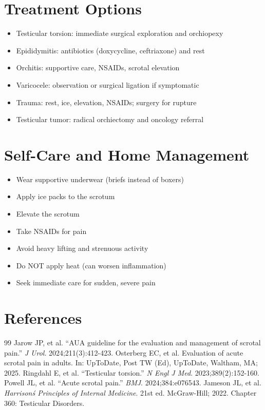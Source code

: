 \section*{Treatment Options}
\begin{itemize}
\item Testicular torsion: immediate surgical exploration and orchiopexy
\item Epididymitis: antibiotics (doxycycline, ceftriaxone) and rest
\item Orchitis: supportive care, NSAIDs, scrotal elevation
\item Varicocele: observation or surgical ligation if symptomatic
\item Trauma: rest, ice, elevation, NSAIDs; surgery for rupture
\item Testicular tumor: radical orchiectomy and oncology referral
\end{itemize}

\section*{Self-Care and Home Management}
\begin{itemize}
\item Wear supportive underwear (briefs instead of boxers)
\item Apply ice packs to the scrotum
\item Elevate the scrotum
\item Take NSAIDs for pain
\item Avoid heavy lifting and strenuous activity
\item Do NOT apply heat (can worsen inflammation)
\item Seek immediate care for sudden, severe pain
\end{itemize}

\section*{References}
\begin{thebibliography}{99}
 Jarow JP, et al. ``AUA guideline for the evaluation and management of scrotal pain.'' \emph{J Urol}. 2024;211(3):412-423.
 Osterberg EC, et al. Evaluation of acute scrotal pain in adults. In: UpToDate, Post TW (Ed), UpToDate, Waltham, MA; 2025.
 Ringdahl E, et al. ``Testicular torsion.'' \emph{N Engl J Med}. 2023;389(2):152-160.
 Powell JL, et al. ``Acute scrotal pain.'' \emph{BMJ}. 2024;384:e076543.
 Jameson JL, et al. \emph{Harrison\'s Principles of Internal Medicine}. 21st ed. McGraw-Hill; 2022. Chapter 360: Testicular Disorders.
\end{thebibliography}
